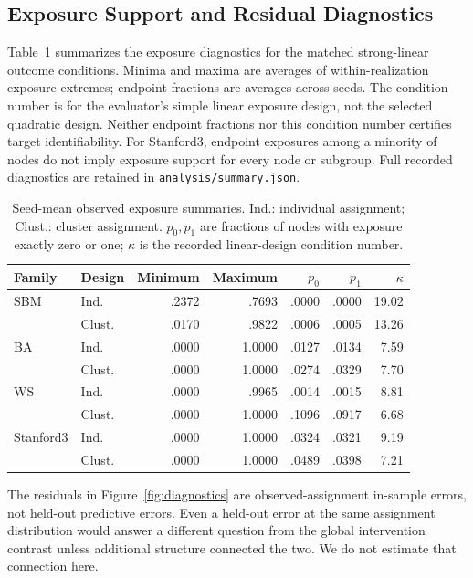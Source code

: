 \documentclass{article}
\begin{document}
\subsection{Exposure Support and Residual Diagnostics}
Table~\ref{tab:support} summarizes the exposure diagnostics for the matched strong-linear outcome conditions. Minima and maxima are averages of within-realization exposure extremes; endpoint fractions are averages across seeds. The condition number is for the evaluator's simple linear exposure design, not the selected quadratic design. Neither endpoint fractions nor this condition number certifies target identifiability. For Stanford3, endpoint exposures among a minority of nodes do not imply exposure support for every node or subgroup. Full recorded diagnostics are retained in \texttt{analysis/summary.json}.
\begin{table}[h]
\centering\small
\caption{Seed-mean observed exposure summaries. Ind.: individual assignment; Clust.: cluster assignment. $p_0,p_1$ are fractions of nodes with exposure exactly zero or one; $\kappa$ is the recorded linear-design condition number.}
\label{tab:support}
\begin{tabular}{llrrrrr}\toprule
Family & Design & Minimum & Maximum & $p_0$ & $p_1$ & $\kappa$\\\midrule
SBM & Ind. & .2372 & .7693 & .0000 & .0000 & 19.02\\
 & Clust. & .0170 & .9822 & .0006 & .0005 & 13.26\\
BA & Ind. & .0000 & 1.0000 & .0127 & .0134 & 7.59\\
 & Clust. & .0000 & 1.0000 & .0274 & .0329 & 7.70\\
WS & Ind. & .0000 & .9965 & .0014 & .0015 & 8.81\\
 & Clust. & .0000 & 1.0000 & .1096 & .0917 & 6.68\\
Stanford3 & Ind. & .0000 & 1.0000 & .0324 & .0321 & 9.19\\
 & Clust. & .0000 & 1.0000 & .0489 & .0398 & 7.21\\\bottomrule
\end{tabular}
\end{table}
The residuals in Figure~\ref{fig:diagnostics} are observed-assignment in-sample errors, not held-out predictive errors. Even a held-out error at the same assignment distribution would answer a different question from the global intervention contrast unless additional structure connected the two. We do not estimate that connection here.
\end{document}
